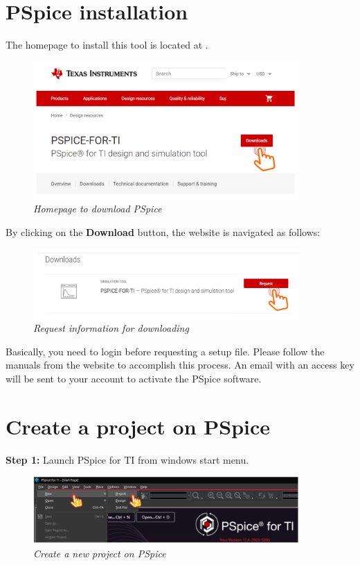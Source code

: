 \section{PSpice installation}
The homepage to install this tool is located at .
\begin{figure}[!htp]
    \centering
    \includegraphics[width=4in]{source/picture/bai_1/pic1.PNG}
    \caption{\textit{Homepage to download PSpice}}
    \label{bai1_pic1}
\end{figure}

By clicking on the \textbf{Download} button, the website is navigated as follows:
\begin{figure}[!htp]
    \centering
    \includegraphics[width=4in]{source/picture/bai_1/pic2.PNG}
    \caption{\textit{Request information for downloading}}
    \label{bai1_pic2}
\end{figure}

Basically, you need to login before requesting a setup file. Please follow the manuals from the website to accomplish this process. An email with an access key will be sent to your account to activate the PSpice software.

\section{Create a project on PSpice}
\textbf{Step 1: } Launch PSpice for TI from windows start menu.
\begin{figure}[!htp]
    \centering
    \includegraphics[width=4in]{source/picture/bai_1/pic4.PNG}
    \caption{\textit{Create a new project on PSpice}}
    \label{bai1_pic4}
\end{figure}

